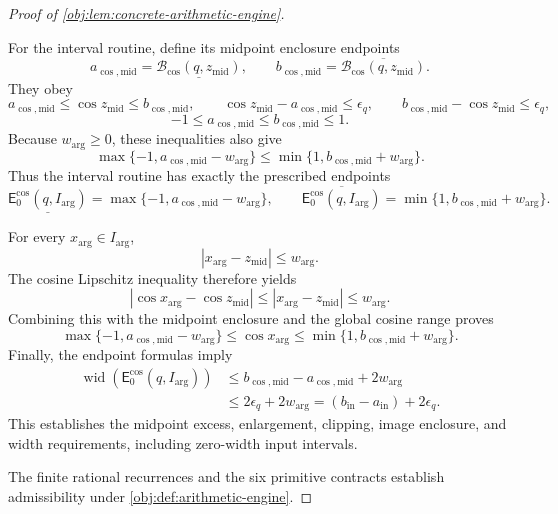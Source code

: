 \begin{proof}[Proof of \cref{obj:lem:concrete-arithmetic-engine}]
\begin{enumerate}
For the interval routine, define its midpoint enclosure endpoints
\[
a_{\cos,\mathrm{mid}}
 =\underline{\mathcal B_{\cos}(q,z_{\mathrm{mid}})},
\qquad
b_{\cos,\mathrm{mid}}
 =\overline{\mathcal B_{\cos}(q,z_{\mathrm{mid}})}.
\]
They obey
\[
a_{\cos,\mathrm{mid}}\le\cos z_{\mathrm{mid}}
 \le b_{\cos,\mathrm{mid}},
\qquad
\cos z_{\mathrm{mid}}-a_{\cos,\mathrm{mid}}\le\epsilon_q,
\qquad
b_{\cos,\mathrm{mid}}-\cos z_{\mathrm{mid}}\le\epsilon_q,
\]
\[
-1\le a_{\cos,\mathrm{mid}}\le b_{\cos,\mathrm{mid}}\le1.
\]
Because \(w_{\mathrm{arg}}\ge0\), these inequalities also give
\[
\max\{-1,a_{\cos,\mathrm{mid}}-w_{\mathrm{arg}}\}
 \le
\min\{1,b_{\cos,\mathrm{mid}}+w_{\mathrm{arg}}\}.
\]
Thus the interval routine has exactly the prescribed endpoints
\[
\underline{\mathsf E_0^{\cos}(q,I_{\mathrm{arg}})}
 =\max\{-1,a_{\cos,\mathrm{mid}}-w_{\mathrm{arg}}\},
\qquad
\overline{\mathsf E_0^{\cos}(q,I_{\mathrm{arg}})}
 =\min\{1,b_{\cos,\mathrm{mid}}+w_{\mathrm{arg}}\}.
\]

For every \(x_{\mathrm{arg}}\in I_{\mathrm{arg}}\),
\[
|x_{\mathrm{arg}}-z_{\mathrm{mid}}|\le w_{\mathrm{arg}}.
\]
The cosine Lipschitz inequality therefore yields
\[
|\cos x_{\mathrm{arg}}-\cos z_{\mathrm{mid}}|
 \le|x_{\mathrm{arg}}-z_{\mathrm{mid}}|
 \le w_{\mathrm{arg}}.
\]
Combining this with the midpoint enclosure and the global cosine range proves
\[
\max\{-1,a_{\cos,\mathrm{mid}}-w_{\mathrm{arg}}\}
 \le\cos x_{\mathrm{arg}}
 \le\min\{1,b_{\cos,\mathrm{mid}}+w_{\mathrm{arg}}\}.
\]
Finally, the endpoint formulas imply
\[
\begin{split}
\operatorname{wid}(\mathsf E_0^{\cos}(q,I_{\mathrm{arg}}))
&\le b_{\cos,\mathrm{mid}}-a_{\cos,\mathrm{mid}}
       +2w_{\mathrm{arg}}\\
&\le2\epsilon_q+2w_{\mathrm{arg}}
 =(b_{\mathrm{in}}-a_{\mathrm{in}})+2\epsilon_q.
\end{split}
\]
This establishes the midpoint excess, enlargement, clipping, image enclosure, and width requirements, including zero-width input intervals.
\end{enumerate}

The finite rational recurrences and the six primitive contracts establish admissibility under \cref{obj:def:arithmetic-engine}.
\end{proof}
